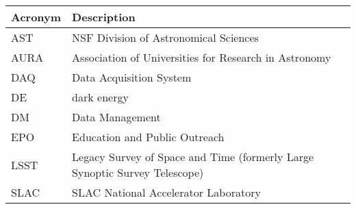 \addtocounter{table}{-1}
\begin{longtable}{p{}p{}}\hline
\textbf{Acronym} & \textbf{Description}  \\\hline

AST & NSF Division of Astronomical Sciences \\\hline
AURA & Association of Universities for Research in Astronomy \\\hline
DAQ & Data Acquisition System \\\hline
DE & dark energy \\\hline
DM & Data Management \\\hline
EPO & Education and Public Outreach \\\hline
LSST & Legacy Survey of Space and Time (formerly Large Synoptic Survey Telescope) \\\hline
SLAC & SLAC National Accelerator Laboratory \\\hline
\end{longtable}
